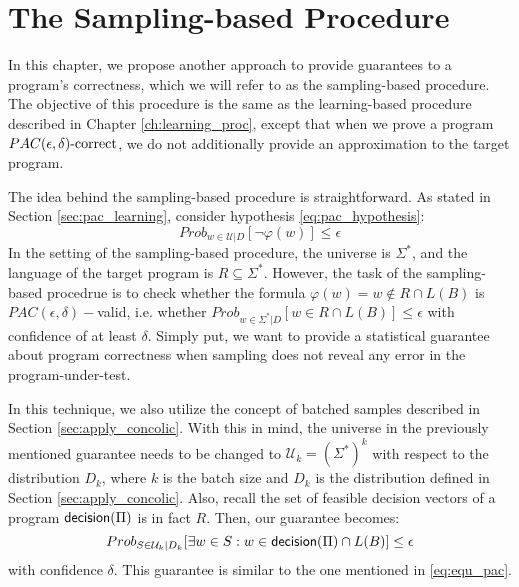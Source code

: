 \chapter{The Sampling-based Procedure}\label{ch:sampling_proc}

In this chapter, we propose another approach to provide guarantees to a program's correctness, which we will refer to as the sampling-based procedure. The objective of this procedure is the same as the learning-based procedure described in Chapter \ref{ch:learning_proc}, except that when we prove a program $PAC(\epsilon, \delta)\text{-correct}$, we do not additionally provide an approximation to the target program. 

The idea behind the sampling-based procedure is straightforward. As stated in Section \ref{sec:pac_learning}, consider hypothesis \ref{eq:pac_hypothesis}:
\begin{equation*}
Prob_{w \in \mathcal{U}|D} [\neg \varphi (w)] \leq \epsilon
\end{equation*}
In the setting of the sampling-based procedure, the universe is $\Sigma^\ast$, and the language of the target program is $R \subseteq \Sigma^\ast$. However, the task of the sampling-based procedrue is to check whether the formula $\varphi(w) = w \notin R \cap L(B)$ is $PAC(\epsilon, \delta)-$valid, i.e. whether $Prob_{w \in \Sigma^\ast | D } [w \in R \cap L(B)] \leq \epsilon$ with confidence of at least $\delta$. Simply put, we want to provide a statistical guarantee about program correctness when sampling does not reveal any error in the program-under-test.

In this technique, we also utilize the concept of batched samples described in Section \ref{sec:apply_concolic}. With this in mind, the universe in the previously mentioned guarantee needs to be changed to $\mathcal{U}_k = (\Sigma^\ast)^k$ with respect to the distribution $D_k$, where $k$ is the batch size and $D_k$ is the distribution defined in Section \ref{sec:apply_concolic}. Also, recall the set of feasible decision vectors of a program $\mathsf{decision}(\Pi)$ is in fact $R$. Then, our guarantee becomes:
\begin{equation}\label{eq:sampling_hypothesis}
Prob_{S \in \mathcal{U}_k | D_k} [\exists w \in S : w \in \mathsf{decision}(\Pi) \cap L(B)] \leq \epsilon
\end{equation} 
with confidence $\delta$. This guarantee is similar to the one mentioned in \ref{eq:equ_pac}. 

